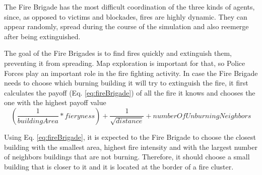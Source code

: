 The Fire Brigade has the most difficult coordination of the three kinds of agents, since, as opposed to victims and blockades, fires are highly dynamic. They can appear randomly, spread during the course of the simulation and also reemerge after being extinguished.

The goal of the Fire Brigades is to find fires quickly and extinguish them, preventing it from spreading. Map exploration is important for that, so Police Forces play an important role in the fire fighting activity. In case the Fire Brigade needs to choose which burning building it will try to extinguish the fire, it first calculates the payoff (Eq. \ref{eq:fireBrigade}) of all the fire it knows and chooses the one with the highest payoff value
\begin{equation}
\label{eq:fireBrigade}
\left(\frac{1}{buildingArea} * fieryness\right) + \frac{1}{\sqrt{distance}} + numberOfUnburningNeighbors
\end{equation}

Using Eq. \ref{eq:fireBrigade}, it is expected to the Fire Brigade to choose the closest building with the smallest area, highest fire intensity and with the largest number of neighbors buildings that are not burning. Therefore, it should choose a small building that is closer to it and it is located at the border of a fire cluster.

